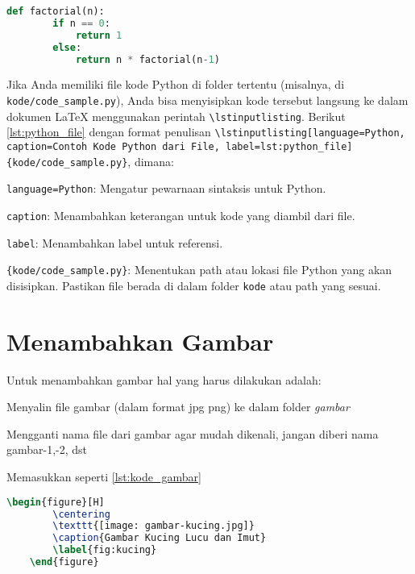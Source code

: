 \begin{lstlisting}[language=Python, caption=Contoh Kode Python Langsung, label=lst:python_direct]
    def factorial(n):
        if n == 0:
            return 1
        else:
            return n * factorial(n-1)
\end{lstlisting}

Jika Anda memiliki file kode Python di folder tertentu (misalnya, di \texttt{kode/code\_sample.py}), Anda bisa menyisipkan kode tersebut langsung ke dalam dokumen LaTeX menggunakan perintah \texttt{\textbackslash lstinputlisting}. Berikut \cref{lst:python_file} dengan format penulisan \texttt{\textbackslash lstinputlisting[language=Python, caption=Contoh Kode Python dari File, label=lst:python\_file]\{kode/code\_sample.py\}}, dimana:
\begin{packed_item}
    \item \texttt{language=Python}: Mengatur pewarnaan sintaksis untuk Python.
    \item \texttt{caption}: Menambahkan keterangan untuk kode yang diambil dari file.
    \item \texttt{label}: Menambahkan label untuk referensi.
    \item \texttt{\{kode/code\_sample.py\}}: Menentukan path atau lokasi file Python yang akan disisipkan. Pastikan file berada di dalam folder \texttt{kode} atau path yang sesuai.
\end{packed_item}



\section{Menambahkan Gambar}
Untuk menambahkan gambar hal yang harus dilakukan adalah:
\begin{packed_enum}
    \item Menyalin file gambar (dalam format jpg \/ png) ke dalam folder \textit{gambar}
    \item Mengganti nama file dari gambar agar mudah dikenali, jangan diberi nama gambar-1,-2, dst
    \item Memasukkan seperti \cref{lst:kode_gambar}
\end{packed_enum}

\begin{lstlisting}[language=TeX, caption=Kode untuk Menyisipkan Gambar dalam Dokumen, label=lst:kode_gambar]
    \begin{figure}[H]
        \centering
        \texttt{[image: gambar-kucing.jpg]}
        \caption{Gambar Kucing Lucu dan Imut}
        \label{fig:kucing}
    \end{figure}
\end{lstlisting}

